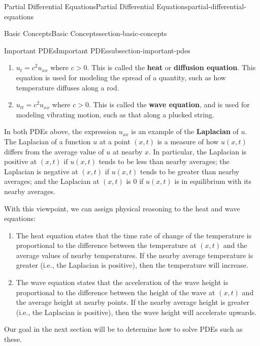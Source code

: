 \documentclass[oneside,10pt,]{book}
\newcommand{\terminology}[1]{\textbf{#1}}
\numberwithin{equation}{section}
\newcommand{\gt}{>}
\begin{document}
\begin{chapterptx}{Partial Differential Equations}{}{Partial Differential Equations}{}{}{partial-differential-equations}
\begin{sectionptx}{Basic Concepts}{}{Basic Concepts}{}{}{section-basic-concepts}
\begin{subsectionptx}{Important PDEs}{}{Important PDEs}{}{}{subsection-important-pdes}
\leavevmode%
\begin{enumerate}
\item\hypertarget{li-31}{}\(u_{t} = c^{2}u_{xx}\) where \(c\gt0\). This is called the \terminology{heat} or \terminology{diffusion equation}. This equation is used for modeling the spread of a quantity, such as how temperature diffuses along a rod.%
\item\hypertarget{li-32}{}\(u_{tt} = c^{2}u_{xx}\) where \(c\gt0\). This is called the \terminology{wave equation}, and is used for modeling vibrating motion, such as that along a plucked string.%
\end{enumerate}
\hypertarget{p-644}{}%
In both PDEs above, the expression \(u_{xx}\) is an example of the \terminology{Laplacian} of \(u\). The Laplacian of a function \(u\) at a point \((x,t)\) is a measure of how \(u(x,t)\) differs from the average value of \(u\) at nearby \(x\). In particular, the Laplacian is positive at \((x,t)\) if \(u(x,t)\) tends to be less than nearby averages; the Laplacian is negative at \((x,t)\) if \(u(x,t)\) tends to be greater than nearby averages; and the Laplacian at \((x,t)\) is \(0\) if \(u(x,t)\) is in equilibrium with its nearby averages.%
\par
\hypertarget{p-645}{}%
With this viewpoint, we can assign physical reasoning to the heat and wave equations:\leavevmode%
\begin{enumerate}
\item\hypertarget{li-33}{}\hypertarget{p-646}{}%
The heat equation states that the time rate of change of the temperature is proportional to the difference between the temperature at \((x,t)\) and the average values of nearby temperatures. If the nearby average temperature is greater (i.e., the Laplacian is positive), then the temperature will increase.%
\item\hypertarget{li-34}{}\hypertarget{p-647}{}%
The wave equation states that the acceleration of the wave height is proportional to the difference between the height of the wave at \((x,t)\) and the average height at nearby points. If the nearby average height is greater (i.e., the Laplacian is positive), then the wave height will accelerate upwards.%
\end{enumerate}
%
\par
\hypertarget{p-648}{}%
Our goal in the next section will be to determine how to solve PDEs such as these.%
\end{subsectionptx}
\end{sectionptx}
%
%
\typeout{************************************************}

\end{chapterptx}
\end{document}
